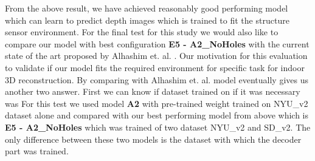 




From the above result, we have achieved reasonably good performing model which can learn to predict depth images which is trained to fit the structure sensor environment. For the final test for this study we would also like to compare our model with best configuration \textbf{E5 - A2\_NoHoles} with the current state of the art proposed by Alhashim et. al. \cite{Alhashim2018}. Our motivation for this evaluation to validate if our model fits the required environment for specific task for indoor 3D reconstruction. By comparing with Alhashim et. al. model eventually gives us another two answer. First we can know if dataset trained on  if it was necessary  was For this test we used  model \textbf{A2} with pre-trained weight trained on NYU\_v2 dataset alone and compared with our best performing model from above which is \textbf{E5 - A2\_NoHoles} which was trained of two dataset NYU\_v2 and SD\_v2. The only difference between these two models is the dataset with which the decoder part was trained.
